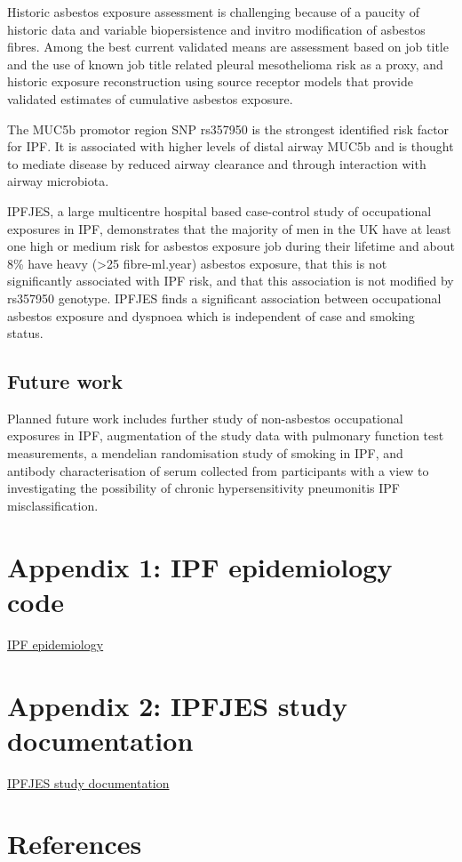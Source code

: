 \documentclass[
]{article}
\begin{document}
Historic asbestos exposure assessment is challenging because of a
paucity of historic data and variable biopersistence and invitro
modification of asbestos fibres. Among the best current validated means
are assessment based on job title and the use of known job title related
pleural mesothelioma risk as a proxy, and historic exposure
reconstruction using source receptor models that provide validated
estimates of cumulative asbestos exposure.

The MUC5b promotor region SNP rs357950 is the strongest identified risk
factor for IPF. It is associated with higher levels of distal airway
MUC5b and is thought to mediate disease by reduced airway clearance and
through interaction with airway microbiota.

IPFJES, a large multicentre hospital based case-control study of
occupational exposures in IPF, demonstrates that the majority of men in
the UK have at least one high or medium risk for asbestos exposure job
during their lifetime and about 8\% have heavy (\textgreater25
fibre-ml.year) asbestos exposure, that this is not significantly
associated with IPF risk, and that this association is not modified by
rs357950 genotype. IPFJES finds a significant association between
occupational asbestos exposure and dyspnoea which is independent of case
and smoking status.

\hypertarget{future-work}{%
\subsection{Future work}\label{future-work}}

Planned future work includes further study of non-asbestos occupational
exposures in IPF, augmentation of the study data with pulmonary function
test measurements, a mendelian randomisation study of smoking in IPF,
and antibody characterisation of serum collected from participants with
a view to investigating the possibility of chronic hypersensitivity
pneumonitis IPF misclassification.

\hypertarget{appendix-1-ipf-epidemiology-code}{%
\section*{Appendix 1: IPF epidemiology
code}\label{appendix-1-ipf-epidemiology-code}}

\href{https://github.com/drcjar/pypf}{IPF epidemiology}

\hypertarget{appendix-2-ipfjes-study-documentation}{%
\section*{Appendix 2: IPFJES study
documentation}\label{appendix-2-ipfjes-study-documentation}}

\href{https://github.com/drcjar/ipfjes/}{IPFJES study documentation}

\footnotesize

\hypertarget{references}{%
\section{References}\label{references}}
\end{document}
